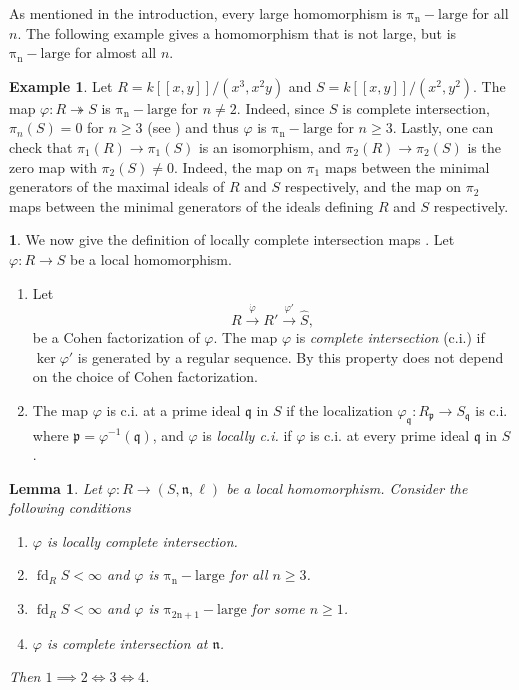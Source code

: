 \documentclass{amsart}
\newtheorem{lemma}[theorem]{Lemma}
\theoremstyle{definition}
\newtheorem{example}[theorem]{Example}
\newtheorem{chunk}[theorem]{}
\newcommand{\n}{\mathfrak{n}}
\newcommand{\fdim}[2]{\operatorname{fd}_{#1}#2}
\newcommand{\pil}[1]{\operatorname{\pi_{#1}-large}}
\begin{document}
As mentioned in the introduction, every large homomorphism is $\pil{n}$ for all $n$. The following example gives a homomorphism that is not large, but is $\pil{n}$ for almost all $n$.
\begin{example}
    Let $R = k[[x,y]]/(x^3,x^2y)$ and $S= k[[x,y]]/(x^2,y^2)$. The map $\varphi\colon R \twoheadrightarrow S$ is $\pil{n}$ for $n\neq 2$. Indeed, since $S$ is complete intersection, $\pi_n(S)=0$ for $n\geq 3$ (see \cite[Section 7.3 and Theorem 10.2.1]{Avramov:2010}) and thus $\varphi$ is $\pil{n}$ for $n \geq 3$. Lastly, one can check that $\pi_1(R) \to \pi_1(S)$ is an isomorphism, and $\pi_2(R) \to \pi_2(S)$ is the zero map with $\pi_2(S) \neq 0$. Indeed, the map on $\pi_1$ maps between the minimal generators of the maximal ideals of $R$ and $S$ respectively, and the map on $\pi_2$ maps between the minimal generators of the ideals defining $R$ and $S$ respectively. 
\end{example}


\begin{chunk} We now give the definition of locally complete intersection maps \cite{Avramov:1999}. Let $\varphi\colon R\rightarrow S$ be a local homomorphism.
\begin{enumerate}
\item Let
\[R\xrightarrow{\dot{\varphi}} R'\xrightarrow{\varphi'} \widehat{S},\]
be a Cohen factorization of $\varphi$. The map $\varphi$ is \textit{complete intersection} (c.i.) if $\ker{\varphi'}$ is generated by a regular sequence. By \cite[Remark 3.3]{Avramov:1999} this property does not depend on the choice of Cohen factorization.
\item The map $\varphi$ is c.i. at a prime ideal $\mathfrak{q}$ in $S$ if the localization $\varphi_{\mathfrak{q}}\colon R_{\mathfrak{p}}\rightarrow S_{\mathfrak{q}}$ is c.i. where $\mathfrak{p}=\varphi^{-1}(\mathfrak{q})$, and $\varphi$ is \textit{locally c.i.} if $\varphi$ is c.i. at every prime ideal $\mathfrak{q}$ in $S$. 
\end{enumerate}
\end{chunk} 


\begin{lemma} \label{L_PiLargeCI} Let $\varphi\colon R\rightarrow (S,\n,\ell)$ be a local homomorphism. Consider the following conditions
\begin{enumerate}
\item $\varphi$ is locally complete intersection.
\item $\fdim{R}{S}<\infty$ and $\varphi$ is $\pil{n}$ for all $n\geq 3$.
\item $\fdim{R}{S}<\infty$ and $\varphi$ is $\pil{2n+1}$ for some $n\geq 1$.
\item $\varphi$ is complete intersection at $\n$.
\end{enumerate}
Then $1\implies 2\iff 3\iff 4$.
\end{lemma}
\end{document}
